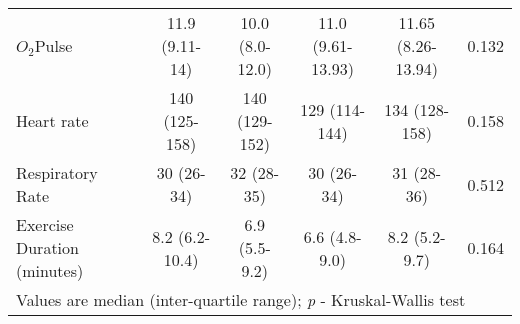 \begin{sidewaystable}[p]
\begin{tabular}{|l| c c c c c|}
		$O_2$Pulse                     & 11.9 (9.11-14)    & 10.0 (8.0-12.0)   & 11.0 (9.61-13.93) & 11.65 (8.26-13.94) & 0.132      \\
		Heart rate                     & 140 (125-158)     & 140 (129-152)     & 129 (114-144)     & 134 (128-158)      & 0.158      \\
		Respiratory Rate               & 30 (26-34)        & 32 (28-35)        & 30 (26-34)        & 31 (28-36)         & 0.512      \\
		Exercise Duration (minutes)    & 8.2 (6.2-10.4)    & 6.9 (5.5-9.2)     & 6.6 (4.8-9.0)     & 8.2 (5.2-9.7)      & 0.164      \\ \hline
		\multicolumn{6}{l}{Values are median (inter-quartile range); \textit{p} - Kruskal-Wallis test}
	\end{tabular}
\end{sidewaystable}
